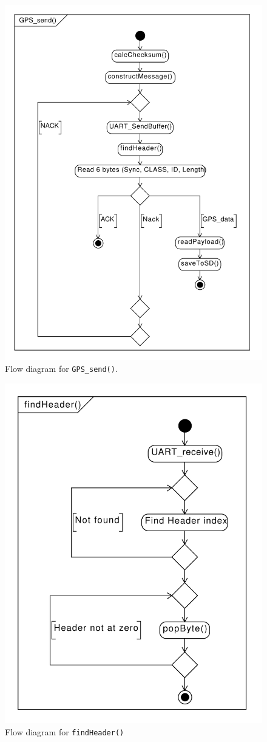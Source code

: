 \begin{figure}
	\centering
	\includegraphics[width=0.7\linewidth]{gfx/Design/GPSFlowSend.pdf}
	\caption{Flow diagram for \texttt{GPS_send()}.}
	\label{fig:gpsflowsend}
\end{figure}

\begin{figure}
	\centering
	\includegraphics[width=0.7\linewidth]{gfx/Design/GPSFlowFindHeader.pdf}
	\caption{Flow diagram for \texttt{findHeader()}}
	\label{fig:gpsflowfindheader}
\end{figure}

